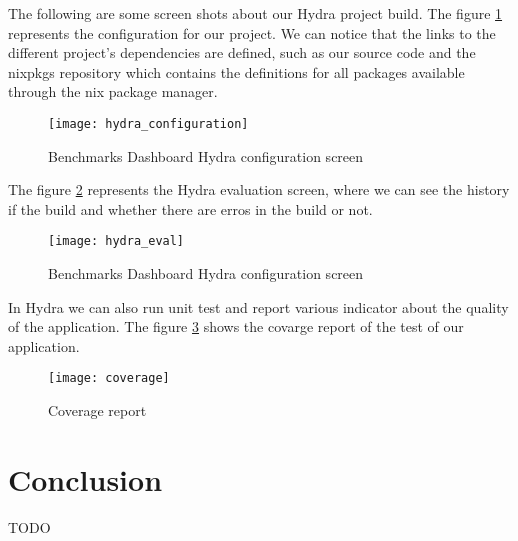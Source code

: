 The following are some screen shots about our Hydra project build. The figure
\hyperref[fig:hydra_configuration]{\ref{fig:hydra_configuration}}
represents the configuration for our project. We can notice that the links to the
different project's dependencies are defined, such as our source code and the
nixpkgs repository which contains the definitions for all packages available through
the nix package manager.

\begin{figure}[h]
\texttt{[image: hydra\_configuration]}
\caption{Benchmarks Dashboard Hydra configuration screen}
\label{fig:hydra_configuration}
\end{figure}

The figure \hyperref[fig:hydra_eval]{\ref{fig:hydra_eval}} represents the Hydra
evaluation screen, where we can see the history if the build and whether there
are erros in the build or not.

\begin{figure}[h]
\texttt{[image: hydra\_eval]}
\caption{Benchmarks Dashboard Hydra configuration screen}
\label{fig:hydra_eval}
\end{figure}

In Hydra we can also run unit test and report various indicator about the
quality of the application. The figure
\hyperref[fig:coverage]{\ref{fig:coverage}} shows the covarge report of the test
of our application.

\begin{figure}[h]
\texttt{[image: coverage]}
\caption{Coverage report}
\label{fig:coverage}
\end{figure}

\clearpage
\section*{Conclusion}
TODO
